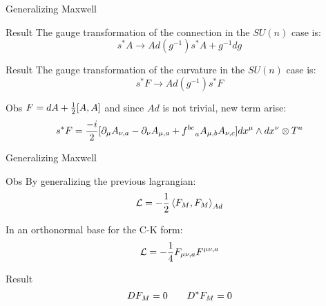 \documentclass{beamer}
\begin{document}
\begin{frame}{Generalizing Maxwell}
	\begin{block}{Result}
		The gauge transformation of the connection in the $SU(n)$ case is:
		$$s^*A\rightarrow Ad(g^{-1})s^*A+g^{-1}dg$$
	\end{block}
	\begin{block}{Result}
		The gauge transformation of the curvature in the $SU(n)$ case is:
		$$s^*F\rightarrow Ad(g^{-1})s^*F$$
	\end{block}
	\begin{exampleblock}{Obs}
		$F=dA+{1\over 2}[A,A]$ and since $Ad$ is not trivial, new term arise:
		$$s^*F={-i\over 2}[\partial_{\mu}A_{\nu,a}-\partial_{\nu}A_{\mu,a}+f^{bc}_{\hspace{9pt}a}A_{\mu,b}A_{\nu,c}]dx^\mu\wedge dx^\nu \otimes T^a$$
	\end{exampleblock}
\end{frame}
\begin{frame}{Generalizing Maxwell}
	\begin{exampleblock}{Obs}
		By generalizing the previous lagrangian:
		$$\mathcal{L}=-{1\over 2}\braket{F_M,F_M}_{Ad}$$
	\end{exampleblock}
	In an orthonormal base for the C-K form:
	$$\mathcal{L}=-{1\over 4}F_{\mu\nu,a}F^{\mu\nu,a}$$
	\begin{block}{Result}
		$$DF_M=0\hspace{20 pt} D^*F_M=0$$
	\end{block}
\end{frame}
\end{document}
